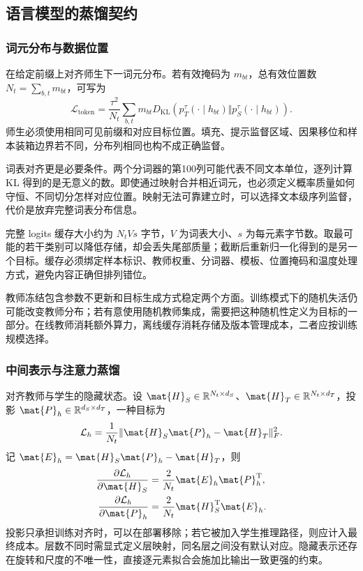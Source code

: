 \documentclass[../textbook.tex]{subfiles}
\begin{document}
\subsection{语言模型的蒸馏契约}

\subsubsection{词元分布与数据位置}
在给定前缀上对齐师生下一词元分布。若有效掩码为 $m_{bt}$，总有效位置数 $N_t=\sum_{b,t}m_{bt}$，可写为
\begin{equation}
 \mathcal L_{\mathrm{token}}=\frac{\tau^2}{N_t}\sum_{b,t}m_{bt}
 D_{\mathrm{KL}}(p_T^\tau(\cdot\mid h_{bt})\Vert p_S^\tau(\cdot\mid h_{bt})).
\end{equation}
师生必须使用相同可见前缀和对应目标位置。填充、提示监督区域、因果移位和样本装箱边界若不同，分布列相同也构不成正确监督。

词表对齐更是必要条件。两个分词器的第100列可能代表不同文本单位，逐列计算 KL 得到的是无意义的数。即使通过映射合并相近词元，也必须定义概率质量如何守恒、不同切分怎样对应位置。映射无法可靠建立时，可以选择文本级序列监督，代价是放弃完整词表分布信息。

完整 logits 缓存大小约为 $N_tVs$ 字节，$V$ 为词表大小、$s$ 为每元素字节数。取最可能的若干类别可以降低存储，却会丢失尾部质量；截断后重新归一化得到的是另一个目标。缓存必须绑定样本标识、教师权重、分词器、模板、位置掩码和温度处理方式，避免内容正确但排列错位。

教师冻结包含参数不更新和目标生成方式稳定两个方面。训练模式下的随机失活仍可能改变教师分布；若有意使用随机教师集成，需要把这种随机性定义为目标的一部分。在线教师消耗额外算力，离线缓存消耗存储及版本管理成本，二者应按训练规模选择。

\subsubsection{中间表示与注意力蒸馏}
对齐教师与学生的隐藏状态。设 $\mat{H}_S\in\mathbb R^{N_t\times d_S}$、$\mat{H}_T\in\mathbb R^{N_t\times d_T}$，投影 $\mat{P}_h\in\mathbb R^{d_S\times d_T}$，一种目标为
\begin{equation}
 \mathcal L_h=\frac1{N_t}\|\mat{H}_S\mat{P}_h-\mat{H}_T\|_F^2.
\end{equation}
记 $\mat{E}_h=\mat{H}_S\mat{P}_h-\mat{H}_T$，则
\begin{equation}
\begin{aligned}
 \frac{\partial\mathcal L_h}{\partial \mat{H}_S} &= \frac2{N_t}\mat{E}_h\mat{P}_h^{\mathrm{T}}, \\
 \frac{\partial\mathcal L_h}{\partial \mat{P}_h} &= \frac2{N_t}\mat{H}_S^{\mathrm{T}}\mat{E}_h.
\end{aligned}
\end{equation}
投影只承担训练对齐时，可以在部署移除；若它被加入学生推理路径，则应计入最终成本。层数不同时需显式定义层映射，同名层之间没有默认对应。隐藏表示还存在旋转和尺度的不唯一性，直接逐元素拟合会施加比输出一致更强的约束。
\end{document}
